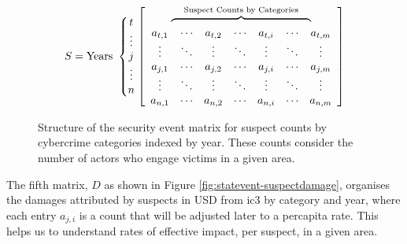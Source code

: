 \begin{figure}[H]
  \centering
\[
S=
\text{Years }\left\{
\begin{matrix}
t\\ \vdots\\ j\\ \vdots\\ n
\end{matrix}
\right.
\left[
\begin{array}{ccccccc}
\multicolumn{7}{c}{%
  \overbrace{%
    \hphantom{a_{t,1}\ \cdots\ a_{t,2}\ \cdots\ a_{t,i}\ \cdots\ a_{t,m}}%
  }^{\text{Suspect Counts by Categories}}%
}\\
a_{t,1} & \cdots & a_{t,2} & \cdots & a_{t,i} & \cdots & a_{t,m} \\
\vdots  & \ddots & \vdots  & \ddots & \vdots  & \ddots & \vdots \\
a_{j,1} & \cdots & a_{j,2} & \cdots & a_{j,i} & \cdots & a_{j,m} \\
\vdots  & \ddots & \vdots  & \ddots & \vdots  & \ddots & \vdots \\
a_{n,1} & \cdots & a_{n,2} & \cdots & a_{n,i} & \cdots & a_{n,m}
\end{array}
\right]
\]

  \caption{Structure of the security event \gls{matrix} for suspect counts by  \gls{cybercrime} categories indexed by year.  These counts consider the number of actors who engage victims in a given area.}
  \label{fig:statevent-suspectcount}
\end{figure}

The fifth \gls{matrix}, $D$ as shown in Figure \ref{fig:statevent-suspectdamage}, organises the damages attributed by suspects in USD from \gls{ic3} by category and year, where each entry $a_{j,i}$ is a count that will be adjusted later to a \gls{percapita} rate.  This helps us to understand rates of effective impact, per suspect, in a given area.

